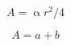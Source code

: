 \documentclass{scrartcl}
\begin{document}
\lipsum[1]

\[ A = \upalpha r^2/4\]

$$ A = a + b $$
\end{document}
